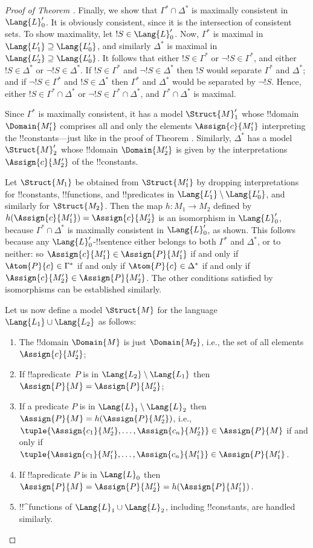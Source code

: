 \documentclass[../../include/open-logic-section]{subfiles}
\begin{document}
\begin{proof}[Proof of Theorem ]
Finally, we show that $\Gamma^* \cap \Delta^*$ is maximally consistent
in $\Lang{L}'_0$. It is obviously consistent, since it is the
intersection of consistent sets. To show maximality, let $!S \in
\Lang{L}'_0$. Now, $\Gamma^*$ is maximal in $\Lang{L'_1}
\supseteq \Lang{L'_0}$, and similarly $\Delta^*$ is maximal in
$\Lang{L'_2} \supseteq \Lang{L'_0}$. It follows that either
$!S \in \Gamma^*$ or $\lnot !S \in \Gamma^*$, and either
$!S \in \Delta^*$ or $\lnot !S \in \Delta^*$. If $!S \in
\Gamma^*$ and $\lnot !S \in \Delta^*$ then $!S$ would
separate $\Gamma^*$ and $\Delta^*$; and if $\lnot !S \in
\Gamma^*$ and $!S \in \Delta^*$ then $\Gamma^*$ and $\Delta^*$
would be separated by $\lnot !S$. Hence, either $!S \in
\Gamma^* \cap \Delta^*$ or $\lnot !S \in \Gamma^* \cap \Delta^*$,
and $\Gamma^* \cap \Delta^*$ is maximal. 

Since $\Gamma^*$ is maximally consistent, it has a model
$\Struct{M}'_1$ whose !!{domain} $\Domain{M'_1}$ comprises all and
only the elements $\Assign{c}{M'_1}$ interpreting the
!!{constant}s---just like in the proof of Theorem
. Similarly, $\Delta^*$ has a model $\Struct{M}'_2$
whose !!{domain} $\Domain{M'_2}$ is given by the interpretations
$\Assign{c}{M'_2}$ of the !!{constant}s.

Let $\Struct{M_1}$ be obtained from $\Struct{M'_1}$ by dropping
interpretations for !!{constant}s, !!{function}s, and !!{predicate}s in
$\Lang{L'_1} \setminus \Lang{L'_0}$, and similarly for
$\Struct{M_2}$. Then the map $h \colon M_1 \to M_2$ defined by
$h(\Assign{c}{M'_1}) = \Assign{c}{M'_2}$ is an
isomorphism in $\Lang{L}'_0$, because $\Gamma^* \cap \Delta^*$ is
maximally consistent in $\Lang{L}'_0$, as shown. This follows
because any $\Lang{L}'_0$-!!{sentence} either belongs to both
$\Gamma^*$ and $\Delta^*$, or to neither: so $\Assign{c}{M'_1} \in
\Assign{P}{M'_1}$ if and only if $\Atom{P}{c} \in \Gamma^*$ if and only if
$\Atom{P}{c} \in \Delta^*$ if and only if $\Assign{c}{M'_2} \in
\Assign{P}{M'_2}$. The other conditions satisfied by isomorphisms
can be established similarly.

Let us now define a model $\Struct{M}$ for the language
$\Lang{L_1} \cup \Lang{L_2}$ as follows:
\begin{enumerate}
\item The !!{domain} $\Domain{M}$ is just $\Domain{M_2}$, i.e., the
  set of all elements $\Assign{c}{M'_2}$; 
\item If !!a{predicate}~$P$ is in $\Lang{L_2} \setminus
  \Lang{L_1}$ then $\Assign{P}{M} = \Assign{P}{M'_2}$;
\item If a predicate $P$ is in $\Lang{L}_1\setminus \Lang{L}_2$ then
  $\Assign{P}{M} = h(\Assign{P}{M'_2})$, i.e.,
  $\tuple{\Assign{c_1}{M'_2}, \dots, \Assign{c_n}{M'_2}} \in
  \Assign{P}{M}$ if and only if $\tuple{\Assign{c_1}{M'_1}, \dots,
  \Assign{c_n}{M'_1}} \in \Assign{P}{M'_1}$.
\item If !!a{predicate} $P$ is in $\Lang{L}_0$ then $\Assign{P}{M} =
  \Assign{P}{M'_2} = h(\Assign{P}{M'_1})$. 
\item !!^{function}s of $\Lang{L}_1 \cup \Lang{L}_2$, including
  !!{constant}s, are handled similarly.
\end{enumerate}


\end{proof}
\end{document}
